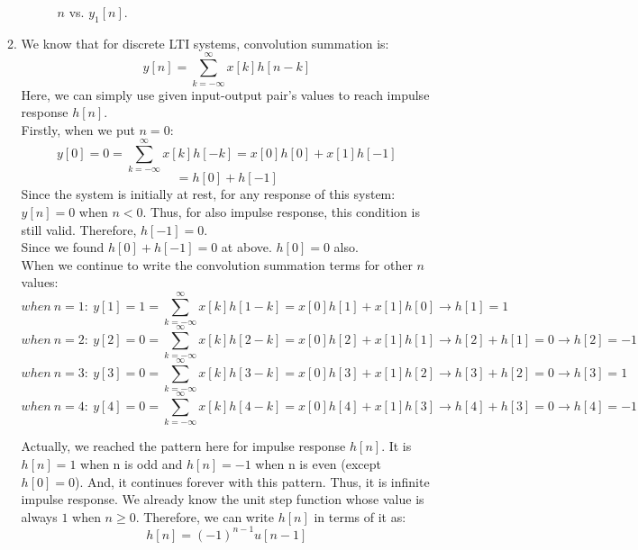 \documentclass[10pt,a4paper, margin=1in]{article}
\begin{document}
\begin{enumerate}
\begin{enumerate}
    
    \begin{figure} [h!]
    \centering
    \caption{$n$ vs. $y_1[n]$.}
    \label{fig:q2a_1}
\end{figure}
    \item %
    We know that for discrete LTI systems, convolution summation is: \\
    \[ y[n] = \sum_{k= -\infty}^{\infty} x[k]h[n-k] \]
    Here, we can simply use given input-output pair's values to reach impulse response $h[n]$. \\
    Firstly, when we put $n=0$:
     \[ y[0] = 0 =  \sum_{k= -\infty}^{\infty} x[k]h[-k] = x[0]h[0] + x[1]h[-1]\]
     \[ = h[0] + h[-1] \]
     Since the system is initially at rest, for any response of this system: $y[n] = 0$  when $n<0$. Thus, for also impulse response, this condition is still valid. Therefore, $h[-1] = 0$. \\
     Since we found $h[0] + h[-1] = 0$ at above. $h[0] = 0$ also. \\
     When we continue to write the convolution summation terms for other $n$ values:
     \[ when \ n=1: \ y[1] = 1 = \sum_{k= -\infty}^{\infty} x[k]h[1-k] = x[0]h[1] + x[1]h[0]  \rightarrow h[1] = 1 \]
     \[ when \ n=2: \ y[2] = 0 = \sum_{k= -\infty}^{\infty} x[k]h[2-k] = x[0]h[2] + x[1]h[1]  \rightarrow h[2]+h[1] = 0 \rightarrow h[2] = -1 \]
     \[ when \ n=3: \ y[3] = 0 = \sum_{k= -\infty}^{\infty} x[k]h[3-k] = x[0]h[3] + x[1]h[2]  \rightarrow h[3]+h[2] = 0 \rightarrow h[3] = 1 \]
     \[ when \ n=4: \ y[4] = 0 = \sum_{k= -\infty}^{\infty} x[k]h[4-k] = x[0]h[4] + x[1]h[3]  \rightarrow h[4]+h[3] = 0 \rightarrow h[4] = -1 \]
     
     Actually, we reached the pattern here for impulse response $h[n]$. It is $h[n] = 1$ when n is odd and $h[n] = -1$ when n is even (except $h[0]=0$). And, it continues forever with this pattern. Thus, it is infinite impulse response. We already know the unit step function whose value is always $1$ when $n \geq 0$. Therefore, we can write $h[n]$ in terms of it as: \\
      \[ h[n] = (-1)^{n-1}u[n-1]\]
      

\end{enumerate}
\end{enumerate}
\end{document}
